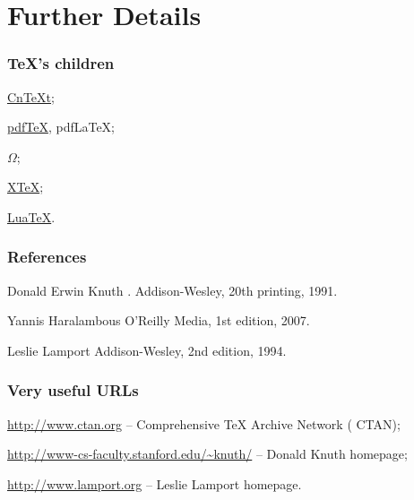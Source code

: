 \documentclass{beamer}
\begin{document}
\section{Further Details}

\begin{frame}
  \frametitle{\TeX 's children}
    \begin{list}
      {\color{blue!90!bg}{$\star$}}{\setlength{\parsep}{.5cm}}
      
    \item \href{ http://wiki.contextgarden.net/Main_Page}{Cn\TeX t};
      \pause
    \item \href{http://www.pdftex.org/}{pdf\TeX}, pdf\LaTeX;
      \pause
    \item \href{http://omega.enstb.org/}{$\Omega$};
      \pause
        \item \href{http://scripts.sil.org/xetex}{X{\small {}}\TeX};
          \pause
          \item\href{http://www.luatex.org}{Lua\TeX}.
  \end{list}
\end{frame}


\begin{frame}
  \frametitle{References}

  \begin{thebibliography}{Haralambous, 2007}
    Donald Erwin Knuth
    .
    \newblock Addison-Wesley, 20th printing, 1991.

    Yannis Haralambous
    \newblock O'Reilly Media, 1st edition, 2007.

    Leslie Lamport
    \newblock Addison-Wesley, 2nd edition, 1994.

  \end{thebibliography}

\end{frame}

\begin{frame}
  \frametitle{Very useful URLs}
  
  \begin{list}
    {\color{darkblue}{$\bullet$}}{\setlength{\parsep}{.8cm}}

    \item \url{http://www.ctan.org}{ -- Comprehensive TeX Archive
      Network ( CTAN)};

    \item \url{http://www-cs-faculty.stanford.edu/~knuth/}{ -- Donald Knuth homepage};

      \item \url{http://www.lamport.org}{ -- Leslie Lamport homepage}.

  \end{list}

\end{frame}
\end{document}
